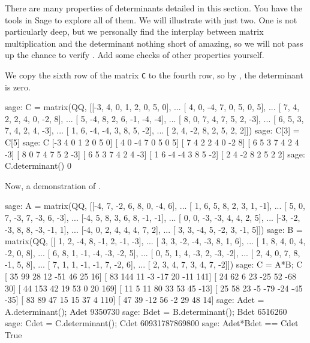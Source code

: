 There are many properties of determinants detailed in this section.  You have the tools in Sage to explore all of them.  We will illustrate with just two.  One is not particularly deep, but we personally find the interplay between matrix multiplication and the determinant nothing short of amazing, so we will not pass up the chance to verify .  Add some checks of other properties yourself.\par
%
We copy the sixth row of the matrix \verb?C? to the fourth row, so by , the determinant is zero.
%
\begin{sageexample}
sage: C = matrix(QQ, [[-3,  4,  0,  1,  2,  0,  5,  0],
...                   [ 4,  0, -4,  7,  0,  5,  0,  5],
...                   [ 7,  4,  2,  2,  4,  0, -2,  8],
...                   [ 5, -4,  8,  2,  6, -1, -4, -4],
...                   [ 8,  0,  7,  4,  7,  5,  2, -3],
...                   [ 6,  5,  3,  7,  4,  2,  4, -3],
...                   [ 1,  6, -4, -4,  3,  8,  5, -2],
...                   [ 2,  4, -2,  8,  2,  5,  2,  2]])
sage: C[3] = C[5]
sage: C
[-3  4  0  1  2  0  5  0]
[ 4  0 -4  7  0  5  0  5]
[ 7  4  2  2  4  0 -2  8]
[ 6  5  3  7  4  2  4 -3]
[ 8  0  7  4  7  5  2 -3]
[ 6  5  3  7  4  2  4 -3]
[ 1  6 -4 -4  3  8  5 -2]
[ 2  4 -2  8  2  5  2  2]
sage: C.determinant()
0
\end{sageexample}
%
Now, a demonstration of .
%
\begin{sageexample}
sage: A = matrix(QQ, [[-4,  7, -2,  6,  8,  0, -4,  6],
...                   [ 1,  6,  5,  8,  2,  3,  1, -1],
...                   [ 5,  0,  7, -3,  7, -3,  6, -3],
...                   [-4,  5,  8,  3,  6,  8, -1, -1],
...                   [ 0,  0, -3, -3,  4,  4,  2,  5],
...                   [-3, -2, -3,  8,  8, -3, -1,  1],
...                   [-4,  0,  2,  4,  4,  4,  7,  2],
...                   [ 3,  3, -4,  5, -2,  3, -1,  5]])
sage: B = matrix(QQ, [[ 1,  2, -4,  8, -1,  2, -1, -3],
...                   [ 3,  3, -2, -4, -3,  8,  1,  6],
...                   [ 1,  8,  4,  0,  4, -2,  0,  8],
...                   [ 6,  8,  1, -1, -4, -3, -2,  5],
...                   [ 0,  5,  1,  4, -3,  2, -3, -2],
...                   [ 2,  4,  0,  7,  8, -1,  5,  8],
...                   [ 7,  1,  1, -1, -1,  7, -2,  6],
...                   [ 2,  3,  4,  7,  3,  4,  7, -2]])
sage: C = A*B; C
[ 35  99  28  12 -51  46  25  16]
[ 83 144  11  -3 -17  20 -11 141]
[ 24  62   6  23 -25  52 -68  30]
[ 44 153  42  19  53   0  20 169]
[ 11   5  11  80  33  53  45 -13]
[ 25  58  23  -5 -79 -24 -45 -35]
[ 83  89  47  15  15  37   4 110]
[ 47  39 -12  56  -2  29  48  14]
sage: Adet = A.determinant(); Adet
9350730
sage: Bdet = B.determinant(); Bdet
6516260
sage: Cdet = C.determinant(); Cdet
60931787869800
sage: Adet*Bdet == Cdet
True
\end{sageexample}
